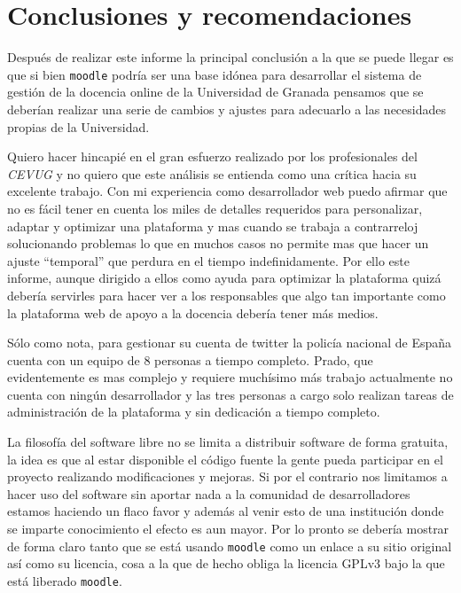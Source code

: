 \chapter{Conclusiones y recomendaciones}

Después de realizar este informe la principal conclusión a la que se puede llegar es que si bien \texttt{moodle} podría ser una base idónea para desarrollar el sistema de gestión de la docencia online de la Universidad de Granada pensamos que se deberían realizar una serie de cambios y ajustes para adecuarlo a las necesidades propias de la Universidad.

\bigskip
Quiero hacer hincapié en el gran esfuerzo realizado por los profesionales del \textit{CEVUG} y no quiero que este análisis se entienda como una crítica hacia su excelente trabajo. Con mi experiencia como desarrollador web puedo afirmar que no es fácil tener en cuenta los miles de detalles requeridos para personalizar, adaptar y optimizar una plataforma y mas cuando se trabaja a contrarreloj solucionando problemas lo que en muchos casos no permite mas que hacer un ajuste ``temporal'' que perdura en el tiempo indefinidamente. Por ello este informe, aunque dirigido a ellos como ayuda para optimizar la plataforma quizá debería servirles para hacer ver a los responsables que algo tan importante como la plataforma web de apoyo a la docencia debería tener más medios.

\bigskip
Sólo como nota, para gestionar su cuenta de twitter la policía nacional de España cuenta con un equipo de 8 personas a tiempo completo. Prado, que evidentemente es mas complejo y requiere muchísimo más trabajo actualmente no cuenta con ningún desarrollador y las tres personas a cargo solo realizan tareas de administración de la plataforma y sin dedicación a tiempo completo.

\bigskip
La filosofía del software libre no se limita a distribuir software de forma gratuita, la idea es que al estar disponible el código fuente la gente pueda participar en el proyecto realizando modificaciones y mejoras. Si por el contrario nos limitamos a hacer uso del software sin aportar nada a la comunidad de desarrolladores estamos haciendo un flaco favor y además al venir esto de una institución donde se imparte conocimiento el efecto es aun mayor. Por lo pronto se debería mostrar de forma claro tanto que se está usando \texttt{moodle} como un enlace a su sitio original así como su licencia, cosa a la que de hecho obliga la licencia GPLv3 bajo la que está liberado \texttt{moodle}.


